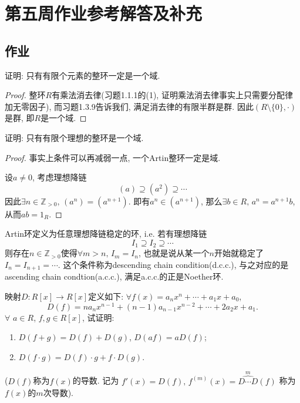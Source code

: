 \documentclass{../solutions-cn}
\begin{document}
\section*{第五周作业参考解答及补充}

\subsection*{作业}

\begin{exercise}[习题2.1.3]
    证明: 只有有限个元素的整环一定是一个域.
\end{exercise}

\begin{proof}
    整环$R$有乘法消去律(习题1.1.1的(1), 证明乘法消去律事实上只需要分配律加无零因子), 而习题1.3.9告诉我们, 满足消去律的有限半群是群. 因此$(R \setminus \{0\}, \cdot)$是群, 即$R$是一个域.
\end{proof}

\begin{exercise}[习题2.1.4]
    证明: 只有有限个理想的整环是一个域.
\end{exercise}

\begin{proof}
    事实上条件可以再减弱一点, 一个Artin整环一定是域.

    设$a \neq 0$, 考虑理想降链
    \[
        (a) \supseteq (a^2) \supseteq \cdots 
    \]
    因此$\exists n \in \mathbb{Z}_{>0},\, (a^n) = (a^{n + 1})$. 即有$a^n \in (a^{n + 1})$, 那么$\exists b \in R,\, a^n = a^{n + 1}b$, 从而$ab = 1_R$.
\end{proof}

\begin{remark}
    Artin环定义为任意理想降链稳定的环, i.e. 若有理想降链
\[
    I_1 \supseteq I_2 \supseteq \cdots 
\]
则存在$n \in \mathbb{Z}_{>0}$使得$\forall m > n,\, I_m = I_n$, 也就是说从某一个$n$开始就稳定了$I_n = I_{n + 1} = \cdots$.
这个条件称为descending chain condition(d.c.c.), 与之对应的是ascending chain condtion(a.c.c.), 满足a.c.c.的正是Noether环.
\end{remark}

\begin{exercise}[习题2.1.9]
    映射$D:R[x] \longrightarrow R[x]$定义如下: 
$\forall f(x) = a_nx^n + \cdots + a_1x + a_0$,
\[
    D(f) = na_nx^{n - 1} + (n - 1)a_{n - 1}x^{n - 2} + \cdots + 2a_2x + a_1.
\]
$\forall$ $a \in R$, $f, g \in R[x]$, 试证明: 
\begin{enumerate}[(1)]
    \item $D(f + g) = D(f) + D(g)$, $D(af) = aD(f)$;
    \item $D(f \cdot g) = D(f) \cdot g + f \cdot D(g)$.
\end{enumerate}
($D(f)$称为$f(x)$的导数. 记为
$f'(x) = D(f),\, f^{(m)}(x) = \overset{m}{\widehat{D \cdots D}}(f)$
称为$f(x)$的$m$次导数).
\end{exercise}
\end{document}
